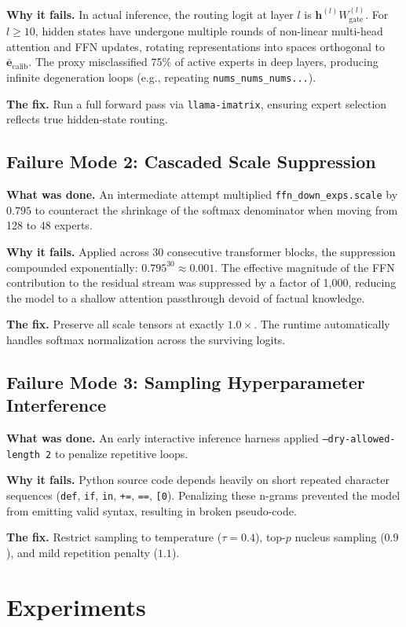 \documentclass[10pt]{article}
\begin{document}
\textbf{Why it fails.} In actual inference, the routing logit at layer $l$ is $\mathbf{h}^{(l)} W_\text{gate}^{(l)}$. For $l \ge 10$, hidden states have undergone multiple rounds of non-linear multi-head attention and FFN updates, rotating representations into spaces orthogonal to $\bar{\mathbf{e}}_\text{calib}$. The proxy misclassified 75\% of active experts in deep layers, producing infinite degeneration loops (e.g., repeating \texttt{nums\_nums\_nums...}).

\textbf{The fix.} Run a full forward pass via \texttt{llama-imatrix}, ensuring expert selection reflects true hidden-state routing.

\subsection{Failure Mode 2: Cascaded Scale Suppression}
\textbf{What was done.} An intermediate attempt multiplied \texttt{ffn\_down\_exps.scale} by $0.795$ to counteract the shrinkage of the softmax denominator when moving from 128 to 48 experts.

\textbf{Why it fails.} Applied across 30 consecutive transformer blocks, the suppression compounded exponentially: $0.795^{30} \approx 0.001$. The effective magnitude of the FFN contribution to the residual stream was suppressed by a factor of 1,000, reducing the model to a shallow attention passthrough devoid of factual knowledge.

\textbf{The fix.} Preserve all scale tensors at exactly $1.0\times$. The runtime automatically handles softmax normalization across the surviving logits.

\subsection{Failure Mode 3: Sampling Hyperparameter Interference}
\textbf{What was done.} An early interactive inference harness applied \texttt{--dry-allowed-length 2} to penalize repetitive loops.

\textbf{Why it fails.} Python source code depends heavily on short repeated character sequences (\texttt{def}, \texttt{if}, \texttt{in}, \texttt{+=}, \texttt{==}, \texttt{[0}). Penalizing these n-grams prevented the model from emitting valid syntax, resulting in broken pseudo-code.

\textbf{The fix.} Restrict sampling to temperature ($\tau=0.4$), top-$p$ nucleus sampling ($0.9$), and mild repetition penalty ($1.1$).

\section{Experiments}
\label{sec:experiments}
\end{document}
